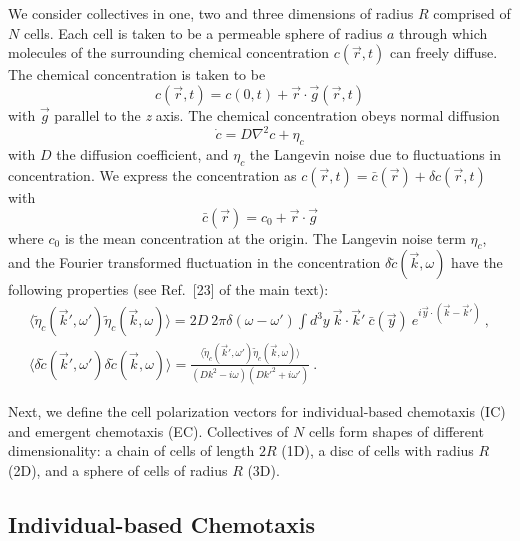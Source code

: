 We consider collectives in one, two and three dimensions of radius $R$ comprised of $N$ cells. Each cell is taken to be a permeable sphere of radius $a$ through which molecules of the surrounding chemical concentration $c(\vec{r},t)$ can freely diffuse. The chemical concentration is taken to be
\begin{equation}
    c(\vec{r},t) = c(0,t) + \vec{r}\cdot\vec{g}(\vec{r},t)
\end{equation}
with $\vec{g}$ parallel to the \textit{z} axis. The chemical concentration obeys normal diffusion
\begin{equation} \label{eq:diffeq}
    \dot{c} = D\nabla^2c+\eta_c
\end{equation}
with $D$ the diffusion coefficient, and $\eta_c$ the Langevin noise due to fluctuations in concentration. We express the concentration as $c(\vec{r},t) = \bar{c}(\vec{r}) + \delta c(\vec{r},t)$ with
\begin{equation} \label{eq:meanc}
    \bar{c}(\vec{r}) = c_0 + \vec{r}\cdot\vec{g}
\end{equation}
where $c_0$ is the mean concentration at the origin. The Langevin noise term $\eta_c$, and the Fourier transformed fluctuation in the concentration $\delta\tilde{c}(\vec{k},\omega)$ have the following properties (see Ref.\ [23] of the main text):
\begin{gather}
    \langle\tilde{\eta}_c(\vec{k}',\omega')\tilde{\eta}_c(\vec{k},\omega) \rangle = 2D \ 2\pi\delta(\omega-\omega') \int d^3y \ \vec{k}\cdot\vec{k}' \ \bar{c}(\vec{y}) \ e^{i\vec{y}\cdot\left(\vec{k}-\vec{k}'\right)} \ ,
    \label{eq:c1} \\
    \langle\delta\tilde{c}(\vec{k}',\omega')\delta\tilde{c}(\vec{k},\omega) \rangle = \frac{\langle\tilde{\eta}_c(\vec{k}',\omega')\tilde{\eta}_c(\vec{k},\omega) \rangle}{(Dk^2-i\omega)(Dk'^2+i\omega')} \ .
    \label{eq:c2}
\end{gather}

Next, we define the cell polarization vectors for individual-based chemotaxis (IC) and emergent chemotaxis (EC). Collectives of $N$ cells form shapes of different dimensionality: a chain of cells of length $2R$ (1D), a disc of cells with radius $R$ (2D), and a sphere of cells of radius $R$ (3D).


\subsection{Individual-based Chemotaxis}

